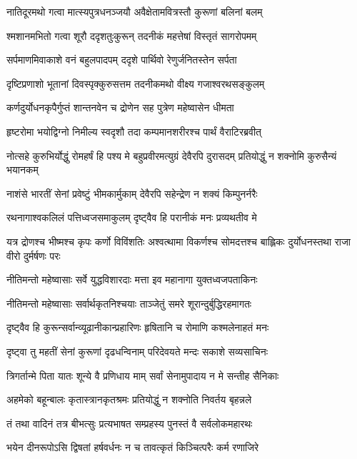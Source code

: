 \twolineshloka
{नातिदूरमथो गत्वा मात्स्यपुत्रधनञ्जयौ}
{अवैक्षेतामवित्रस्तौ कुरूणां बलिनां बलम्}


\twolineshloka
{श्मशानमभितो गत्वा शूरौ ददृशतुःकुरून्}
{तदनीकं महत्तेषां विस्तृतं सागरोपमम्}


\twolineshloka
{सर्पमाणमिवाकाशे वनं बहुलपादपम्}
{ददृशे पार्थिवो रेणुर्जनितस्तेन सर्पता}


\twolineshloka
{दृष्टिप्रणाशो भूतानां दिवस्पृक्कुरुसत्तम}
{तदनीकमथो वीक्ष्य गजाश्वरथसङ्कुलम्}


\twolineshloka
{कर्णदुर्योधनकृपैर्गुप्तं शान्तनवेन च}
{द्रोणेन सह पुत्रेण महेष्वासेन धीमता}


\twolineshloka
{हृष्टरोमा भयोद्विग्नो निमील्य स्वदृशौ तदा}
{कम्पमानशरीरश्च पार्थं वैराटिरब्रवीत्}


\threelineshloka
{नोत्सहे कुरुभिर्योद्धुं रोमहर्षं हि पश्य मे}
{बहुप्रवीरमत्युग्रं देवैरपि दुरासदम्}
{प्रतियोद्धुं न शक्नोमि कुरुसैन्यं भयानकम्}


\twolineshloka
{नाशंसे भारतीं सेनां प्रवेष्टुं भीमकार्मुकाम्}
{देवैरपि सहेन्द्रेण न शक्यं किम्पुनर्नरैः}


\twolineshloka
{रथनागाश्वकलिलं पत्तिध्वजसमाकुलम्}
{दृष्ट्वैव हि परानीकं मनः प्रव्यथतीव मे}


\threelineshloka
{यत्र द्रोणश्च भीष्मश्च कृपः कर्णो विविंशतिः}
{अश्वत्थामा विकर्णश्च सोमदत्तश्च बाह्लिकः}
{दुर्योधनस्तथा राजा वीरो दुर्मर्षणः परः}


\twolineshloka
{नीतिमन्तो महेष्वासाः सर्वे युद्धविशारदाः}
{मत्ता इव महानागा युक्तध्वजपताकिनः}


\twolineshloka
{नीतिमन्तो महेष्वासाः सर्वार्थकृतनिश्चयाः}
{ताञ्जेतुं समरे शूरान्दुर्बुद्धिरहमागतः}


\twolineshloka
{दृष्ट्वैव हि कुरून्सर्वान्व्यूढानीकान्प्रहारिणः}
{हृषितानि च रोमाणि कश्मलेनाहतं मनः}



\twolineshloka
{दृष्ट्वा तु महतीं सेनां कुरूणां दृढधन्विनाम्}
{परिदेवयते मन्दः सकाशे सव्यसाचिनः}


\twolineshloka
{त्रिगर्तान्मे पिता यातः शून्ये वै प्रणिधाय माम्}
{सर्वां सेनामुपादाय न मे सन्तीह सैनिकाः}


\twolineshloka
{अहमेको बहून्बालः कृतास्त्रानकृतश्रमः}
{प्रतियोद्धुं न शक्नोति निवर्तय बृहन्नले}



\twolineshloka
{तं तथा वादिनं तत्र बीभत्सुः प्रत्यभाषत}
{सम्प्रहस्य पुनस्तं वै सर्वलोकमहारथः}


\twolineshloka
{भयेन दीनरूपोऽसि द्विषतां हर्षवर्धनः}
{न च तावत्कृतं किञ्चित्परैः कर्म रणाजिरे}


